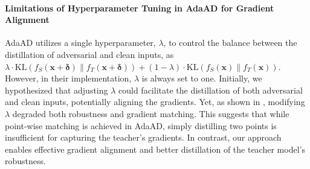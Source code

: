 \documentclass{article} %
\begin{document}
\paragraph{Limitations of Hyperparameter Tuning in AdaAD for Gradient Alignment} AdaAD utilizes a single hyperparameter, $\lambda$, to control the balance between the distillation of adversarial and clean inputs, as $\lambda \cdot \text{KL}(f_S(\textbf{x} + \boldsymbol{\delta}) \| f_T(\textbf{x} + \boldsymbol{\delta})) + (1 - \lambda) \cdot \text{KL}(f_S(\textbf{x}) \| f_T(\textbf{x}))$. However, in their implementation, $\lambda$ is always set to one.
Initially, we hypothesized that adjusting $\lambda$ could facilitate the distillation of both adversarial and clean inputs, potentially aligning the gradients.
Yet, as shown in , modifying $\lambda$ degraded both robustness and gradient matching.
This suggests that while point-wise matching is achieved in AdaAD, simply distilling two points is insufficient for capturing the teacher’s gradients. 
In contrast, our approach enables effective gradient alignment and better distillation of the teacher model’s robustness.






\end{document}
